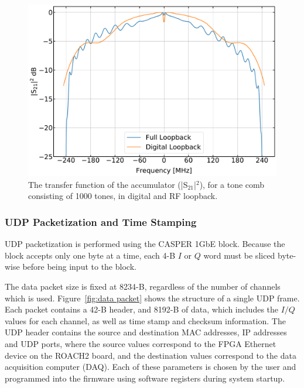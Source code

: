 \begin{figure}[!htbp]
\centering
\includegraphics[width=\textwidth]{figures/readout/sim/accum_1000_lpf_nolpf}
\caption[~The transfer function of the accumulator (), for a tone comb consisting of 1000 tones, in digital and RF loopback.]{The transfer function of the accumulator (|S$_{21}$|$^{2}$), for a tone comb consisting of 1000 tones, in digital and RF loopback.}
\label{fig:accum}
\end{figure}

\subsubsection{UDP Packetization and Time Stamping}\label{packets}

UDP packetization is performed using the CASPER 1GbE block. Because the block accepts only one byte at a time, each 4-B $I$ or $Q$ word must be sliced byte-wise before being input to the block.

The data packet size is fixed at 8234-B, regardless of the number of channels which is used. Figure~\ref{fig:data packet} shows the structure of a single UDP frame. Each packet contains a 42-B header, and 8192-B of data, which includes the $I/Q$ values for each channel, as well as time stamp and checksum information. The UDP header contains the source and destination MAC addresses, IP addresses and UDP ports, where the source values correspond to the FPGA Ethernet device on the ROACH2 board, and the destination values correspond to the data acquisition computer (DAQ). Each of these parameters is chosen by the user and programmed into the firmware using software registers during system startup.

